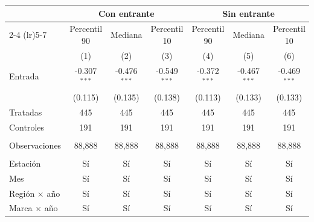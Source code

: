 
\begingroup
\centering
\begin{tabular}{lcccccc}
   \toprule
    & \multicolumn{3}{c}{Con entrante} & \multicolumn{3}{c}{Sin entrante} \\ \cmidrule(lr){2-4} \cmidrule(lr){5-7}
                        & Percentil 90   & Mediana        & Percentil 10   & Percentil 90   & Mediana        & Percentil 10 \\   
                        & (1)            & (2)            & (3)            & (4)            & (5)            & (6)\\  
   \midrule 
   Entrada              & -0.307$^{***}$ & -0.476$^{***}$ & -0.549$^{***}$ & -0.372$^{***}$ & -0.467$^{***}$ & -0.469$^{***}$\\   
                        & (0.115)        & (0.135)        & (0.138)        & (0.113)        & (0.133)        & (0.133)\\   
   Tratadas             & 445            & 445            & 445            & 445            & 445            & 445\\  
   Controles            & 191            & 191            & 191            & 191            & 191            & 191\\  
    \\
   Observaciones        & 88,888         & 88,888         & 88,888         & 88,888         & 88,888         & 88,888\\  
    \\
   Estación             & Sí             & Sí             & Sí             & Sí             & Sí             & Sí\\  
   Mes                  & Sí             & Sí             & Sí             & Sí             & Sí             & Sí\\  
   Región $\times$ año  & Sí             & Sí             & Sí             & Sí             & Sí             & Sí\\  
   Marca $\times$ año   & Sí             & Sí             & Sí             & Sí             & Sí             & Sí\\  
   \bottomrule
\end{tabular}
\par\endgroup


